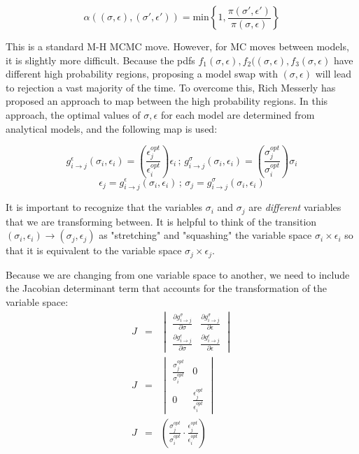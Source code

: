 \documentclass[12pt]{minimal}
\begin{document}
\begin{equation}
\alpha((\sigma, \epsilon),(\sigma', \epsilon')) = \mathrm{min} \left \{ 1, \frac{\pi(\sigma', \epsilon')}{\pi(\sigma, \epsilon)} \right \}
\end{equation}


This is a standard M-H MCMC move.  However, for MC moves between models, it is slightly more difficult.  Because the pdfs $f_1(\sigma, \epsilon), f_2((\sigma, \epsilon),f_3(\sigma, \epsilon)$ have different high probability regions, proposing a model swap with $(\sigma, \epsilon)$ will lead to rejection a vast majority of the time. To overcome this, Rich Messerly has proposed an approach to map between the high probability regions.  In this approach, the optimal values of $\sigma, \epsilon$ for each model are determined from analytical models, and the following map is used:

\begin{equation}
g^{\epsilon}_{i\rightarrow j}(\sigma_i,\epsilon_i)=\left ( \frac{\epsilon^{opt}_j}{\epsilon^{opt}_i}\right ) \epsilon_i \, ; \, g^{\sigma}_{i\rightarrow j}(\sigma_i,\epsilon_i)=\left ( \frac{\sigma^{opt}_j}{\sigma^{opt}_i}\right ) \sigma_i
\end{equation}
\begin{equation}
\epsilon_j=g^{\epsilon}_{i\rightarrow j}(\sigma_i,\epsilon_i) \, ; \, \sigma_j=g^{\sigma}_{i\rightarrow j}(\sigma_i,\epsilon_i)
\end{equation}

It is important to recognize that the variables $\sigma_i$ and $\sigma_j$ are \emph{different} variables that we are transforming between.  It is helpful to think of the transition $(\sigma_i,\epsilon_i)\rightarrow (\sigma_j,\epsilon_j)$ as "stretching" and "squashing" the variable space $\sigma_i \times \epsilon_i$ so that it is equivalent to the variable space $\sigma_j \times \epsilon_j$.

Because we are changing from one variable space to another, we need to include the Jacobian determinant term that accounts for the transformation of the variable space:
\begin{eqnarray}
J & = & \begin{vmatrix}
\frac{\partial g^{\sigma}_{i\rightarrow j}}{\partial \sigma } & \frac{\partial g^{\sigma}_{i\rightarrow j}}{\partial \epsilon } \\ 
\frac{\partial g^{\epsilon}_{i\rightarrow j}}{\partial \sigma } & \frac{\partial g^{\epsilon}_{i\rightarrow j}}{\partial \epsilon }
\end{vmatrix}\\
J & = & \begin{vmatrix}
\frac{\sigma^{opt}_j}{\sigma^{opt}_i} & 0 \\ 
0 & \frac{\epsilon^{opt}_j}{\epsilon^{opt}_i}
\end{vmatrix}\\
J & = & \left (\frac{\sigma^{opt}_j}{\sigma^{opt}_i} \cdot \frac{\epsilon^{opt}_j}{\epsilon^{opt}_i} \right )
\end{eqnarray}
\end{document}
